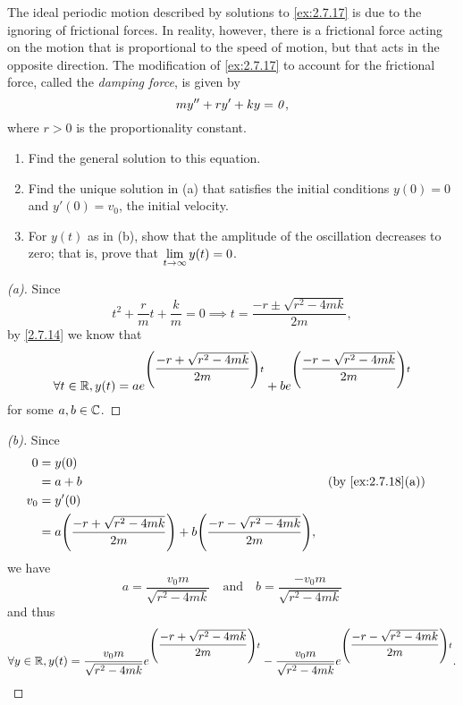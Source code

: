\begin{ex}\label{ex:2.7.18}
  The ideal periodic motion described by solutions to \cref{ex:2.7.17} is due to the ignoring of frictional forces.
  In reality, however, there is a frictional force acting on the motion that is proportional to the speed of motion, but that acts in the opposite direction.
  The modification of \cref{ex:2.7.17} to account for the frictional force, called the \emph{damping force}, is given by
  \[
    m y'' + r y' + ky = \mathit{0},
  \]
  where \(r > 0\) is the proportionality constant.
  \begin{enumerate}
    \item Find the general solution to this equation.
    \item Find the unique solution in (a) that satisfies the initial conditions \(y(0) = 0\) and \(y'(0) = v_0\), the initial velocity.
    \item For \(y(t)\) as in (b), show that the amplitude of the oscillation decreases to zero;
          that is, prove that \(\lim\limits_{t \to \infty} y(t) = 0\).
  \end{enumerate}
\end{ex}

\begin{proof}[(a)]
  Since
  \[
    t^2 + \dfrac{r}{m} t + \dfrac{k}{m} = 0 \implies t = \dfrac{-r \pm \sqrt{r^2 - 4mk}}{2m},
  \]
  by \cref{2.7.14} we know that
  \[
    \forall t \in \mathbb{R}, y(t) = a e^{\left\lparen\dfrac{-r + \sqrt{r^2 - 4mk}}{2m}\right\rparen t} + b e^{\left\lparen\dfrac{-r - \sqrt{r^2 - 4mk}}{2m}\right\rparen t}
  \]
  for some \(a, b \in \mathbb{C}\).
\end{proof}

\begin{proof}[(b)]
  Since
  \begin{align*}
    0   & = y(0)                                                                                                        \\
        & = a + b                                                                                &  & \by{ex:2.7.18}[a] \\
    v_0 & = y'(0)                                                                                                       \\
        & = a \pa{\dfrac{-r + \sqrt{r^2 - 4mk}}{2m}} + b \pa{\dfrac{-r - \sqrt{r^2 - 4mk}}{2m}},
  \end{align*}
  we have
  \[
    a = \dfrac{v_0 m}{\sqrt{r^2 - 4mk}} \quad \text{and} \quad b = \dfrac{-v_0 m}{\sqrt{r^2 - 4mk}}
  \]
  and thus
  \[
    \forall y \in \mathbb{R}, y(t) = \dfrac{v_0 m}{\sqrt{r^2 - 4mk}} e^{\left\lparen\dfrac{-r + \sqrt{r^2 - 4mk}}{2m}\right\rparen t} - \dfrac{v_0 m}{\sqrt{r^2 - 4mk}} e^{\left\lparen\dfrac{-r - \sqrt{r^2 - 4mk}}{2m}\right\rparen t}.
  \]
\end{proof}

